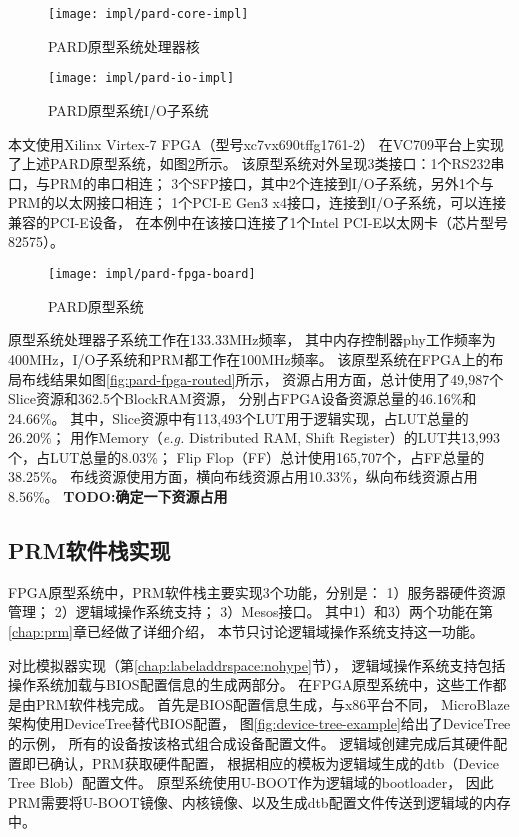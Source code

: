 \begin{figure}[tb]
\begin{minipage}{0.48\textwidth}
  \centering
  \texttt{[image: impl/pard-core-impl]}
  \caption{PARD原型系统处理器核}
  \label{fig:pard-core-impl}
\end{minipage}\hfill
\begin{minipage}{0.48\textwidth}
  \centering
  \texttt{[image: impl/pard-io-impl]}
  \caption{PARD原型系统I/O子系统}
  \label{fig:pard-io-impl}
\end{minipage}
\end{figure}

本文使用Xilinx Virtex-7 FPGA（型号xc7vx690tffg1761-2）
在VC709平台上实现了上述PARD原型系统，如图\ref{fig:pard-fpga-board}所示。
该原型系统对外呈现3类接口：1个RS232串口，与PRM的串口相连；
3个SFP接口，其中2个连接到I/O子系统，另外1个与PRM的以太网接口相连；
1个PCI-E Gen3 x4接口，连接到I/O子系统，可以连接兼容的PCI-E设备，
在本例中在该接口连接了1个Intel PCI-E以太网卡（芯片型号82575）。

\begin{figure}[tb]
  \centering
  \texttt{[image: impl/pard-fpga-board]}
  \caption{PARD原型系统}
  \label{fig:pard-fpga-board}
\end{figure}

原型系统处理器子系统工作在133.33MHz频率，
其中内存控制器phy工作频率为400MHz，I/O子系统和PRM都工作在100MHz频率。
该原型系统在FPGA上的布局布线结果如图\ref{fig:pard-fpga-routed}所示，
资源占用方面，总计使用了49,987个Slice资源和362.5个BlockRAM资源，
分别占FPGA设备资源总量的46.16\%和24.66\%。
其中，Slice资源中有113,493个LUT用于逻辑实现，占LUT总量的26.20\%；
用作Memory（\emph{e.g.} Distributed RAM, Shift Register）的LUT共13,993个，占LUT总量的8.03\%；
Flip Flop（FF）总计使用165,707个，占FF总量的38.25\%。
布线资源使用方面，横向布线资源占用10.33\%，纵向布线资源占用8.56\%。
\textbf{TODO:确定一下资源占用} 


\subsection{PRM软件栈实现}

FPGA原型系统中，PRM软件栈主要实现3个功能，分别是：
1）服务器硬件资源管理；
2）逻辑域操作系统支持；
3）Mesos接口。
其中1）和3）两个功能在第\ref{chap:prm}章已经做了详细介绍，
本节只讨论逻辑域操作系统支持这一功能。

对比模拟器实现（第\ref{chap:labeladdrspace:nohype}节），
逻辑域操作系统支持包括操作系统加载与BIOS配置信息的生成两部分。
在FPGA原型系统中，这些工作都是由PRM软件栈完成。
首先是BIOS配置信息生成，与x86平台不同，
MicroBlaze架构使用DeviceTree\cite{device-tree}替代BIOS配置，
图\ref{fig:device-tree-example}给出了DeviceTree的示例，
所有的设备按该格式组合成设备配置文件。
逻辑域创建完成后其硬件配置即已确认，PRM获取硬件配置，
根据相应的模板为逻辑域生成的dtb（Device Tree Blob）配置文件。
原型系统使用U-BOOT\cite{u-boot}作为逻辑域的bootloader，
因此PRM需要将U-BOOT镜像、内核镜像、以及生成dtb配置文件传送到逻辑域的内存中。

